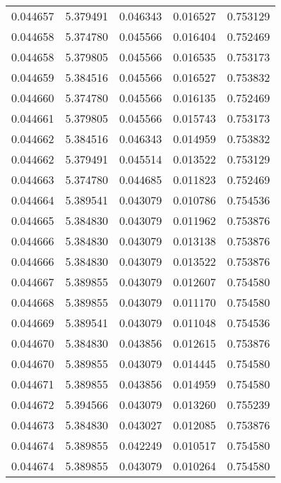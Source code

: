 \begin{tabular}{lrrrr}
0.044657    &  5.379491 &  0.046343 &  0.016527 &             0.753129 \\
0.044658    &  5.374780 &  0.045566 &  0.016404 &             0.752469 \\
0.044658    &  5.379805 &  0.045566 &  0.016535 &             0.753173 \\
0.044659    &  5.384516 &  0.045566 &  0.016527 &             0.753832 \\
0.044660    &  5.374780 &  0.045566 &  0.016135 &             0.752469 \\
0.044661    &  5.379805 &  0.045566 &  0.015743 &             0.753173 \\
0.044662    &  5.384516 &  0.046343 &  0.014959 &             0.753832 \\
0.044662    &  5.379491 &  0.045514 &  0.013522 &             0.753129 \\
0.044663    &  5.374780 &  0.044685 &  0.011823 &             0.752469 \\
0.044664    &  5.389541 &  0.043079 &  0.010786 &             0.754536 \\
0.044665    &  5.384830 &  0.043079 &  0.011962 &             0.753876 \\
0.044666    &  5.384830 &  0.043079 &  0.013138 &             0.753876 \\
0.044666    &  5.384830 &  0.043079 &  0.013522 &             0.753876 \\
0.044667    &  5.389855 &  0.043079 &  0.012607 &             0.754580 \\
0.044668    &  5.389855 &  0.043079 &  0.011170 &             0.754580 \\
0.044669    &  5.389541 &  0.043079 &  0.011048 &             0.754536 \\
0.044670    &  5.384830 &  0.043856 &  0.012615 &             0.753876 \\
0.044670    &  5.389855 &  0.043079 &  0.014445 &             0.754580 \\
0.044671    &  5.389855 &  0.043856 &  0.014959 &             0.754580 \\
0.044672    &  5.394566 &  0.043079 &  0.013260 &             0.755239 \\
0.044673    &  5.384830 &  0.043027 &  0.012085 &             0.753876 \\
0.044674    &  5.389855 &  0.042249 &  0.010517 &             0.754580 \\
0.044674    &  5.389855 &  0.043079 &  0.010264 &             0.754580 \\

\end{tabular}
